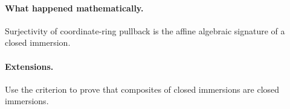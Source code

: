 \paragraph{What happened mathematically.}
Surjectivity of coordinate-ring pullback is the affine algebraic signature of a closed immersion.

\paragraph{Extensions.}
Use the criterion to prove that composites of closed immersions are closed immersions.
\fi

